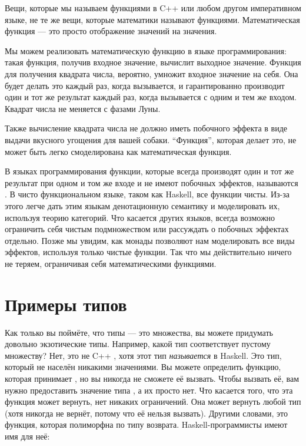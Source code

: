 Вещи, которые мы называем функциями в C++ или любом другом императивном языке,
не те же вещи, которые математики называют функциями. Математическая
функция --- это просто отображение значений на значения.

Мы можем реализовать математическую функцию в языке программирования: такая
функция, получив входное значение, вычислит выходное значение. Функция
для получения квадрата числа, вероятно, умножит входное
значение на себя. Она будет делать это каждый раз, когда вызывается, и
гарантированно производит один и тот же результат каждый раз, когда вызывается с одним и
тем же входом. Квадрат числа не меняется с фазами
Луны.

Также вычисление квадрата числа не должно иметь побочного эффекта
в виде выдачи вкусного угощения для вашей собаки. ``Функция'', которая делает это,
не может быть легко смоделирована как математическая функция.

В языках программирования функции, которые всегда производят один и тот же результат
при одном и том же входе и не имеют побочных эффектов, называются . В чисто функциональном языке, таком как Haskell, все функции
чисты. Из-за этого легче дать этим языкам денотационную
семантику и моделировать их, используя теорию категорий. Что касается других языков,
всегда возможно ограничить себя чистым подмножеством или рассуждать
о побочных эффектах отдельно. Позже мы увидим, как монады позволяют нам моделировать
все виды эффектов, используя только чистые функции. Так что мы действительно ничего не теряем,
ограничивая себя математическими функциями.

\section{Примеры типов}

Как только вы поймёте, что типы --- это множества, вы можете придумать довольно
экзотические типы. Например, какой тип соответствует пустому
множеству? Нет, это не C++ , хотя этот тип \emph{называется}
 в Haskell. Это тип, который не населён никакими
значениями. Вы можете определить функцию, которая принимает , но вы
никогда не сможете её вызвать. Чтобы вызвать её, вам нужно предоставить значение типа
, а их просто нет. Что касается того, что эта функция может
вернуть, нет никаких ограничений. Она может вернуть любой тип
(хотя никогда не вернёт, потому что её нельзя вызвать). Другими словами,
это функция, которая полиморфна по типу возврата. Haskell-программисты имеют
имя для неё:

